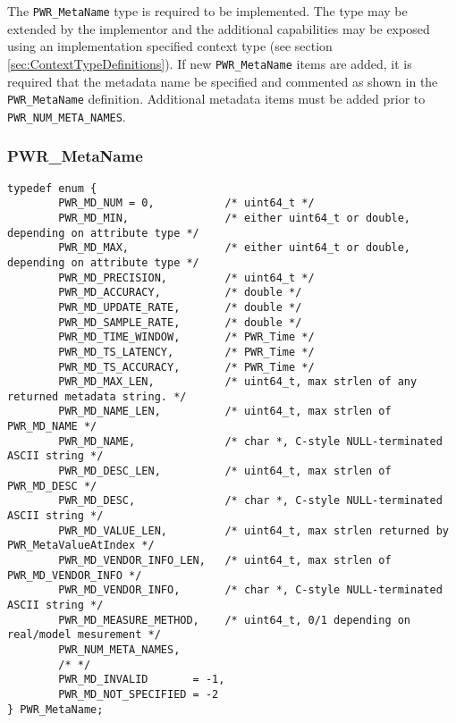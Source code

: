The \texttt{PWR_MetaName} type is required to be implemented. 
The type may be extended by the implementor and the additional capabilities may be exposed using an implementation specified context type (see section \ref{sec:ContextTypeDefinitions}).
If new \texttt{PWR_MetaName} items are added, it is required that the metadata name be specified and commented as shown in the \texttt{PWR_MetaName} definition. 
Additional metadata items must be added prior to \texttt{PWR_NUM_META_NAMES}.



\subsubsection{PWR_MetaName}\label{type:MetaName}
\begin{center}
\begin{minipage}{.95\linewidth}%
\begin{lstlisting}
typedef enum {
        PWR_MD_NUM = 0,           /* uint64_t */
        PWR_MD_MIN,               /* either uint64_t or double, depending on attribute type */
        PWR_MD_MAX,               /* either uint64_t or double, depending on attribute type */
        PWR_MD_PRECISION,         /* uint64_t */
        PWR_MD_ACCURACY,          /* double */
        PWR_MD_UPDATE_RATE,       /* double */
        PWR_MD_SAMPLE_RATE,       /* double */
        PWR_MD_TIME_WINDOW,       /* PWR_Time */
        PWR_MD_TS_LATENCY,        /* PWR_Time */
        PWR_MD_TS_ACCURACY,       /* PWR_Time */
        PWR_MD_MAX_LEN,           /* uint64_t, max strlen of any returned metadata string. */
        PWR_MD_NAME_LEN,          /* uint64_t, max strlen of PWR_MD_NAME */
        PWR_MD_NAME,              /* char *, C-style NULL-terminated ASCII string */
        PWR_MD_DESC_LEN,          /* uint64_t, max strlen of PWR_MD_DESC */
        PWR_MD_DESC,              /* char *, C-style NULL-terminated ASCII string */
        PWR_MD_VALUE_LEN,         /* uint64_t, max strlen returned by PWR_MetaValueAtIndex */
        PWR_MD_VENDOR_INFO_LEN,   /* uint64_t, max strlen of PWR_MD_VENDOR_INFO */
        PWR_MD_VENDOR_INFO,       /* char *, C-style NULL-terminated ASCII string */
        PWR_MD_MEASURE_METHOD,    /* uint64_t, 0/1 depending on real/model mesurement */
        PWR_NUM_META_NAMES,
        /* */
        PWR_MD_INVALID       = -1,
        PWR_MD_NOT_SPECIFIED = -2
} PWR_MetaName;
\end{lstlisting}
\end{minipage}
\end{center}


